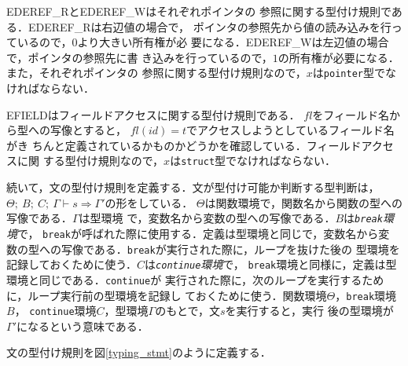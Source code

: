 E{\footnotesize DEREF\_R}とE{\footnotesize DEREF\_W}はそれぞれポインタの
参照に関する型付け規則である．E{\footnotesize DEREF\_R}は右辺値の場合で，
ポインタの参照先から値の読み込みを行っているので，$0$より大きい所有権が必
要になる．E{\footnotesize DEREF\_W}は左辺値の場合で，ポインタの参照先に書
き込みを行っているので，$1$の所有権が必要になる．また，それぞれポインタの
参照に関する型付け規則なので，$x$は\texttt{pointer}型でなければならない．

E{\footnotesize FIELD}はフィールドアクセスに関する型付け規則である．
$\mathit{fl}$をフィールド名から型への写像とすると，
$\mathit{fl}(\mathit{id}) = t$でアクセスしようとしているフィールド名がき
ちんと定義されているかものかどうかを確認している．フィールドアクセスに関
する型付け規則なので，$x$は\texttt{struct}型でなければならない．

続いて，文の型付け規則を定義する．文が型付け可能か判断する型判断は，
$\Theta;\ B;\ C;\ \Gamma \vdash s \Rightarrow \Gamma'$の形をしている．
$\Theta$は関数環境で，関数名から関数の型への写像である．$\Gamma$は型環境
で，変数名から変数の型への写像である．$B$は\emph{\texttt{break}環境}で，
\texttt{break}が呼ばれた際に使用する．定義は型環境と同じで，変数名から変
数の型への写像である．\texttt{break}が実行された際に，ループを抜けた後の
型環境を記録しておくために使う．$C$は\emph{\texttt{continue}環境}で，
\texttt{break}環境と同様に，定義は型環境と同じである．\texttt{continue}が
実行された際に，次のループを実行するために，ループ実行前の型環境を記録し
ておくために使う．関数環境$\Theta$，\texttt{break}環境$B$，
\texttt{continue}環境$C$，型環境$\Gamma$のもとで，文$s$を実行すると，実行
後の型環境が$\Gamma'$になるという意味である．

\begin{definition}[文]
文の型付け規則を図\ref{typing_stmt}のように定義する．
\end{definition}

